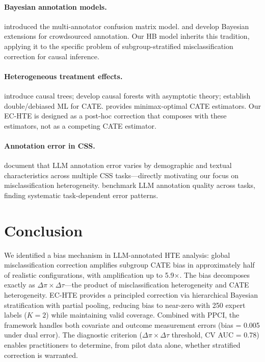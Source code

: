 \documentclass[11pt]{article}
\newcommand{\dpi}{\Delta\pi}
\newcommand{\dtau}{\Delta\tau}
\begin{document}
\paragraph{Bayesian annotation models.}
\citet{dawid1979maximum} introduced the multi-annotator confusion matrix model.
\citet{passonneau2014benefits} and \citet{hovy2013learning} develop Bayesian extensions for crowdsourced annotation.
Our HB model inherits this tradition, applying it to the specific problem of subgroup-stratified misclassification correction for causal inference.

\paragraph{Heterogeneous treatment effects.}
\citet{athey2016recursive} introduce causal trees; \citet{wager2018estimation} develop causal forests with asymptotic theory; \citet{chernozhukov2018double} establish double/debiased ML for CATE.
\citet{kennedy2023towards} provides minimax-optimal CATE estimators.
Our EC-HTE is designed as a post-hoc correction that composes with these estimators, not as a competing CATE estimator.

\paragraph{Annotation error in CSS.}
\citet{ashwin2025using} document that LLM annotation error varies by demographic and textual characteristics across multiple CSS tasks---directly motivating our focus on misclassification heterogeneity.
\citet{pangakis2023automated} benchmark LLM annotation quality across tasks, finding systematic task-dependent error patterns.


\section{Conclusion}
\label{sec:conclusion}

We identified a bias mechanism in LLM-annotated HTE analysis: global misclassification correction amplifies subgroup CATE bias in approximately half of realistic configurations, with amplification up to 5.9$\times$.
The bias decomposes exactly as $\dpi \times \dtau$---the product of misclassification heterogeneity and CATE heterogeneity.
EC-HTE provides a principled correction via hierarchical Bayesian stratification with partial pooling, reducing bias to near-zero with 250 expert labels ($K{=}2$) while maintaining valid coverage.
Combined with PPCI, the framework handles both covariate and outcome measurement errors (bias = 0.005 under dual error).
The diagnostic criterion ($\dpi \times \dtau$ threshold, CV AUC = 0.78) enables practitioners to determine, from pilot data alone, whether stratified correction is warranted.
\end{document}
